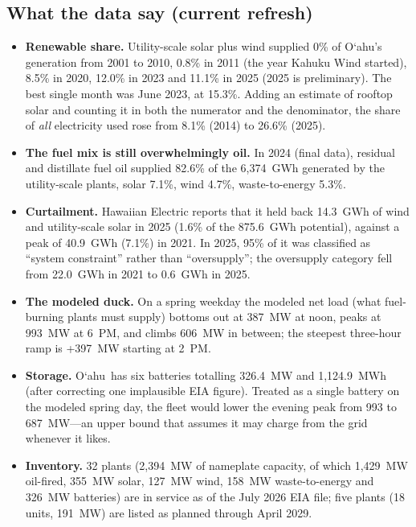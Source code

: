\documentclass[11pt,a4paper]{article}
\newcommand{\okina}{\textquoteleft}
\newcommand{\Oahu}{\texorpdfstring{O\okina ahu}{Oahu}}
\begin{document}
\subsection*{What the data say (current refresh)}
\begin{itemize}
\item \textbf{Renewable share.} Utility-scale solar plus wind supplied 0\% of \Oahu's generation from 2001 to
 2010, 0.8\% in 2011 (the year Kahuku Wind started), 8.5\% in 2020, 12.0\% in 2023 and 11.1\% in 2025 (2025 is
 preliminary). The best single month was June 2023, at 15.3\%. Adding an estimate of rooftop solar and
 counting it in both the numerator and the denominator, the share of \emph{all} electricity used rose from 8.1\%
 (2014) to 26.6\% (2025).
\item \textbf{The fuel mix is still overwhelmingly oil.} In 2024 (final data), residual and distillate fuel oil
 supplied 82.6\% of the 6,374~GWh generated by the utility-scale plants, solar 7.1\%, wind 4.7\%, waste-to-energy
 5.3\%.
\item \textbf{Curtailment.} Hawaiian Electric reports that it held back 14.3~GWh of wind and utility-scale solar in
 2025 (1.6\% of the 875.6~GWh potential), against a peak of 40.9~GWh (7.1\%) in 2021. In 2025, 95\% of it was
 classified as ``system constraint'' rather than ``oversupply''; the oversupply category fell from 22.0~GWh in
 2021 to 0.6~GWh in 2025.
\item \textbf{The modeled duck.} On a spring weekday the modeled net load (what fuel-burning plants must supply)
 bottoms out at 387~MW at noon, peaks at 993~MW at 6~PM, and climbs 606~MW in between; the steepest three-hour
 ramp is +397~MW starting at 2~PM.
\item \textbf{Storage.} \Oahu\ has six batteries totalling 326.4~MW and 1,124.9~MWh (after correcting one
 implausible EIA figure). Treated as a single battery on the modeled spring day, the fleet would lower the
 evening peak from 993 to 687~MW---an upper bound that assumes it may charge from the grid whenever it likes.
\item \textbf{Inventory.} 32 plants (2,394~MW of nameplate capacity, of which 1,429~MW oil-fired, 355~MW solar,
 127~MW wind, 158~MW waste-to-energy and 326~MW batteries) are in service as of the July 2026 EIA file; five
 plants (18 units, 191~MW) are listed as planned through April 2029.
\end{itemize}
\end{document}
